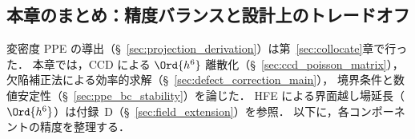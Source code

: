 %
\subsection{本章のまとめ：精度バランスと設計上のトレードオフ}
\label{sec:pressure_accuracy_summary}

変密度 PPE の導出（§~\ref{sec:projection_derivation}）は第~\ref{sec:collocate}章で行った．
本章では，CCD による $\Ord{h^6}$ 離散化（§~\ref{sec:ccd_poisson_matrix}），
欠陥補正法による効率的求解（§~\ref{sec:defect_correction_main}），
境界条件と数値安定性（§~\ref{sec:ppe_bc_stability}）を論じた．
HFE による界面越し場延長（$\Ord{h^6}$）は付録~D（§~\ref{sec:field_extension}）を参照．
以下に，各コンポーネントの精度を整理する．

